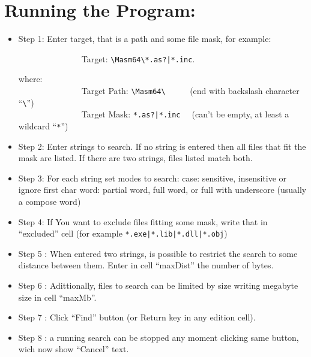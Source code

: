 \documentclass[11pt,a4paper]{scrartcl}
\begin{document}
\title{\color{myblue}{LookingFor }}
\subtitle{\color{myblue}{A Masm64 tool to find strings in files}}

\author{Héctor S. Enrique}
\date{ may 30, 2024}
\maketitle

\section{Running the Program: }

    \begin{itemize}
        \item Step 1: Enter target, that is a path and some file mask, for example:
         
        \verb$              $ Target: \verb$\Masm64\*.as?|*.inc$. 
        
	\hspace{1cm} where:\\
        \verb$              $ Target Path: \verb$\Masm64\     $  (end with backslash character ``\verb$\$'') \\
        \verb$              $ Target Mask: \verb$*.as?|*.inc  $  (can't be empty, at least a wildcard ``\verb$*$'') 
        
        \item Step 2: Enter strings to search. If no string is entered then all files that fit the mask are listed. If there are two strings, files listed match both.
        \item Step 3: For each string set modes to search:
	 \subitem case: sensitive, insensitive or ignore first char
	 \subitem word: partial word, full word, or full with underscore (usually a compose word) 
        \item Step 4:  If You want to exclude files fitting some mask, write that in ``excluded'' cell (for example \verb$*.exe|*.lib|*.dll|*.obj$)
        \item Step 5 : When entered two strings, is possible to restrict the search to some distance between them. Enter in cell ``maxDist'' the number of bytes.
        \item Step 6 : Adittionally, files to search can be limited by size writing megabyte size in cell ``maxMb''.
        \item Step 7 : Click ``Find'' button (or Return key in any edition cell).
        \item Step 8 : a running search can be stopped any moment clicking same button, wich now show ``Cancel'' text.
     \end{itemize}
\end{document}

